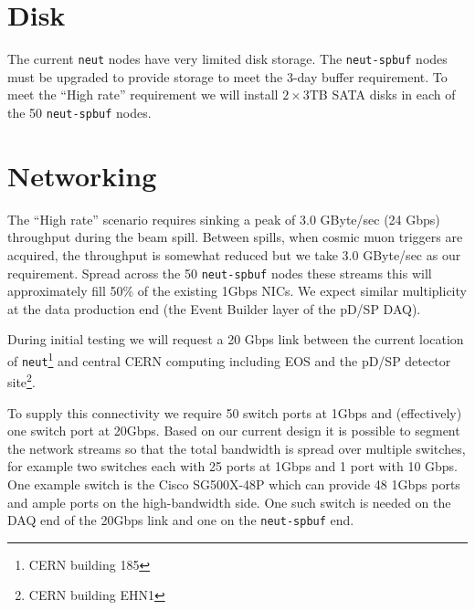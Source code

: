 \documentclass[pdftex,12pt,letter]{article}
\begin{document}
\section{Disk}

The current \texttt{neut} nodes have very limited disk storage.  The
\texttt{neut-spbuf} nodes must be upgraded to provide storage to meet
the 3-day buffer requirement. To meet the ``High rate'' requirement we
will install $2\times 3$TB SATA disks in each of the 50
\texttt{neut-spbuf} nodes.

\section{Networking}

The ``High rate'' scenario requires sinking a peak of 3.0 GByte/sec
(24 Gbps) throughput during the beam spill.  Between spills, when
cosmic muon triggers are acquired, the throughput is somewhat reduced
but we take 3.0 GByte/sec as our requirement.  Spread across the 50
\texttt{neut-spbuf} nodes these streams this will approximately fill
50\% of the existing 1Gbps NICs.  We expect similar multiplicity at
the data production end (the Event Builder layer of the pD/SP DAQ).

During initial testing we will request a 20 Gbps link between the
current location of \texttt{neut}\footnote{CERN building 185} and
central CERN computing including EOS and the pD/SP detector
site\footnote{CERN building EHN1}.

To supply this connectivity we require 50 switch ports at 1Gbps and
(effectively) one switch port at 20Gbps.  Based on our current design
it is possible to segment the network streams so that the total
bandwidth is spread over multiple switches, for example two switches
each with 25 ports at 1Gbps and 1 port with 10 Gbps.  One example
switch is the Cisco SG500X-48P which can provide 48 1Gbps ports and
ample ports on the high-bandwidth side.  One such switch is needed on
the DAQ end of the 20Gbps link and one on the \texttt{neut-spbuf} end.
\end{document}
